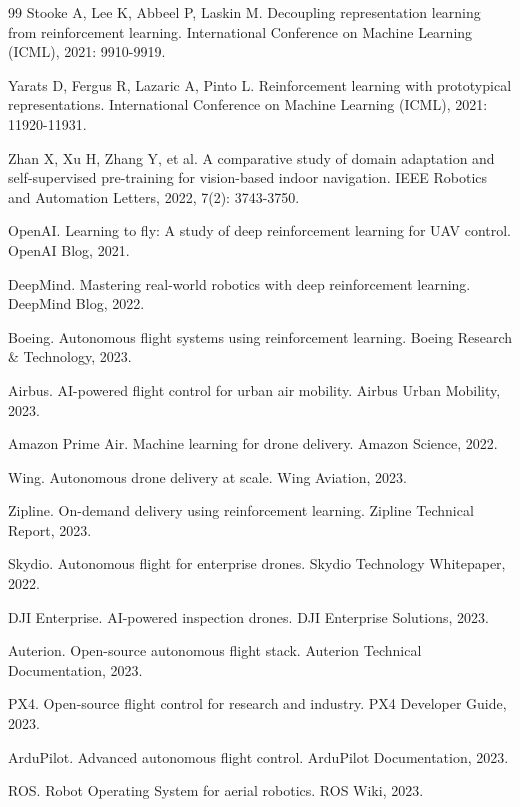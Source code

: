 \documentclass[12pt,a4paper]{ctexart}
\begin{document}
\begin{thebibliography}{99}
 Stooke A, Lee K, Abbeel P, Laskin M. Decoupling representation learning from reinforcement learning. International Conference on Machine Learning (ICML), 2021: 9910-9919.

 Yarats D, Fergus R, Lazaric A, Pinto L. Reinforcement learning with prototypical representations. International Conference on Machine Learning (ICML), 2021: 11920-11931.

 Zhan X, Xu H, Zhang Y, et al. A comparative study of domain adaptation and self-supervised pre-training for vision-based indoor navigation. IEEE Robotics and Automation Letters, 2022, 7(2): 3743-3750.

 OpenAI. Learning to fly: A study of deep reinforcement learning for UAV control. OpenAI Blog, 2021.

 DeepMind. Mastering real-world robotics with deep reinforcement learning. DeepMind Blog, 2022.

 Boeing. Autonomous flight systems using reinforcement learning. Boeing Research \& Technology, 2023.

 Airbus. AI-powered flight control for urban air mobility. Airbus Urban Mobility, 2023.

 Amazon Prime Air. Machine learning for drone delivery. Amazon Science, 2022.

 Wing. Autonomous drone delivery at scale. Wing Aviation, 2023.

 Zipline. On-demand delivery using reinforcement learning. Zipline Technical Report, 2023.

 Skydio. Autonomous flight for enterprise drones. Skydio Technology Whitepaper, 2022.

 DJI Enterprise. AI-powered inspection drones. DJI Enterprise Solutions, 2023.

 Auterion. Open-source autonomous flight stack. Auterion Technical Documentation, 2023.

 PX4. Open-source flight control for research and industry. PX4 Developer Guide, 2023.

 ArduPilot. Advanced autonomous flight control. ArduPilot Documentation, 2023.

 ROS. Robot Operating System for aerial robotics. ROS Wiki, 2023.


\end{thebibliography}
\end{document}
